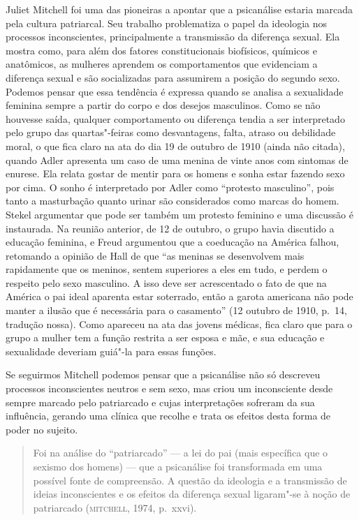 Juliet Mitchell foi uma das pioneiras a apontar que a psicanálise
estaria marcada pela cultura patriarcal. Seu trabalho problematiza o
papel da ideologia nos processos inconscientes, principalmente a
transmissão da diferença sexual. Ela mostra como, para além dos fatores
constitucionais biofísicos, químicos e anatômicos, as mulheres aprendem
os comportamentos que evidenciam a diferença sexual e são socializadas
para assumirem a posição do segundo sexo. Podemos pensar que essa
tendência é expressa quando se analisa a sexualidade feminina sempre a
partir do corpo e dos desejos masculinos. Como se não houvesse saída,
qualquer comportamento ou diferença tendia a ser interpretado pelo grupo
das quartas"-feiras como desvantagens, falta, atraso ou debilidade moral,
o que fica claro na ata do dia 19 de outubro de 1910 (ainda não citada),
quando Adler apresenta um caso de uma menina de vinte anos com sintomas
de enurese. Ela relata gostar de mentir para os homens e sonha estar
fazendo sexo por cima. O sonho é interpretado por Adler como ``protesto
masculino'', pois tanto a masturbação quanto urinar são considerados como
marcas do homem. Stekel argumentar que pode ser também um protesto
feminino e uma discussão é instaurada. Na reunião anterior, de 12 de
outubro, o grupo havia discutido a educação feminina, e Freud argumentou
que a coeducação na América falhou, retomando a opinião de Hall de que
``as meninas se desenvolvem mais rapidamente que os meninos, sentem
 superiores a eles em tudo, e perdem o respeito pelo sexo masculino. A
 isso deve ser acrescentado o fato de que na América o pai ideal aparenta
 estar soterrado, então a garota americana não pode manter a ilusão que é
 necessária para o casamento'' (12 outubro de 1910, p.~14, tradução nossa).
Como apareceu na ata das jovens médicas, fica claro que para o grupo a
mulher tem a função restrita a ser esposa e mãe, e sua educação e
sexualidade deveriam guiá"-la para essas funções.

Se seguirmos Mitchell podemos pensar que a psicanálise não só
descreveu processos inconscientes neutros e sem sexo, mas criou um
inconsciente desde sempre marcado pelo patriarcado e cujas
interpretações sofreram da sua influência, gerando uma clínica que
recolhe e trata os efeitos desta forma de poder no sujeito.

\begin{quote}
Foi na análise do ``patriarcado'' --- a lei do pai (mais específica que o
sexismo dos homens) --- que a psicanálise foi transformada em uma
possível fonte de compreensão. A questão da ideologia e a transmissão de
ideias inconscientes e os efeitos da diferença sexual ligaram"-se à noção
de patriarcado (\textsc{mitchell}, 1974, p.~xxvi).
\end{quote}

